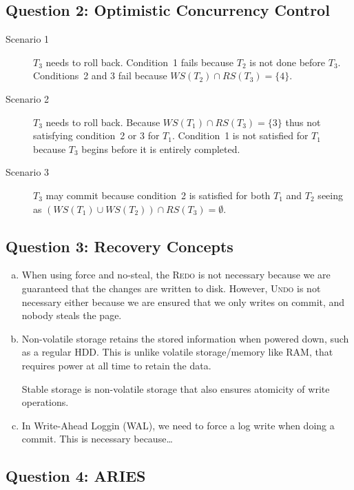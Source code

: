 \documentclass[a4paper]{article}
\begin{document}
\subsection{Question 2: Optimistic Concurrency Control}

\begin{description}
    \item[Scenario 1] $T_3$ needs to roll back. Condition~1 fails because $T_2$
        is not done before $T_3$. Conditions~2 and 3 fail because $WS(T_2) \cap
        RS(T_3) = \{4\}$.
    \item[Scenario 2] $T_3$ needs to roll back. Because $WS(T_1) \cap RS(T_3) =
        \{3\}$ thus not satisfying condition~2 or 3 for $T_1$. Condition~1 is
        not satisfied for $T_1$ because $T_3$ begins before it is entirely
        completed.
    \item[Scenario 3] $T_3$ may commit because condition~2 is satisfied for
        both $T_1$ and $T_2$ seeing as $(WS(T_1) \cup WS(T_2)) \cap RS(T_3) =
        \emptyset$.
\end{description}

\subsection{Question 3: Recovery Concepts}

\begin{enumerate}[(a)]
    \item When using force and no-steal, the \textsc{Redo} is not necessary
        because we are guaranteed that the changes are written to disk.
        However, \textsc{Undo} is not necessary either because we are ensured
        that we only writes on commit, and nobody steals the page.
    \item Non-volatile storage retains the stored information when powered
        down, such as a regular HDD\@. This is unlike volatile storage/memory
        like RAM, that requires power at all time to retain the data.

        Stable storage is non-volatile storage that also ensures atomicity of
        write operations.
    \item In Write-Ahead Loggin (WAL), we need to force a log write when doing
        a commit. This is necessary because\ldots {}
\end{enumerate}

\subsection{Question 4: ARIES}
\end{document}
